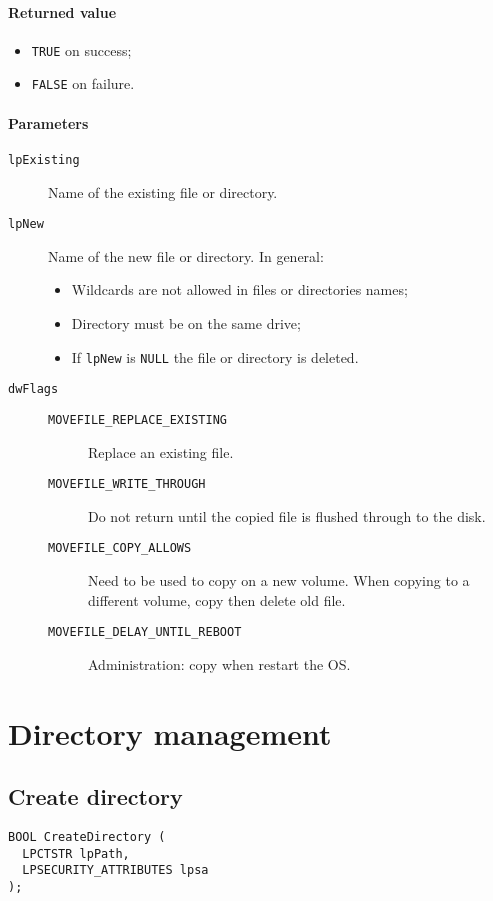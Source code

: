 \paragraph{Returned value}
\begin{itemize}
\item \texttt{TRUE} on success;
\item \texttt{FALSE} on failure.
\end{itemize}

\paragraph{Parameters}
\begin{description}
\item [\texttt{lpExisting}] Name of the existing file or directory.
\item [\texttt{lpNew}] Name of the new file or directory. In general:
\begin{itemize}
\item Wildcards are not allowed in files or directories names;
\item Directory must be on the same drive;
\item If \texttt{lpNew} is \texttt{NULL} the file or directory is deleted.
\end{itemize}
\item [\texttt{dwFlags}]
\begin{description}
\item [\texttt{MOVEFILE\_REPLACE\_EXISTING}] Replace an existing file.
\item [\texttt{MOVEFILE\_WRITE\_THROUGH}] Do not return until the copied file is flushed through to the disk.
\item [\texttt{MOVEFILE\_COPY\_ALLOWS}] Need to be used to copy on a new volume. When copying to a different volume, copy then delete old file.
\item [\texttt{MOVEFILE\_DELAY\_UNTIL\_REBOOT}] Administration: copy when restart the OS.
\end{description}
\end{description}

\section{Directory management}
\subsection{Create directory}
\begin{verbatim}
BOOL CreateDirectory (
  LPCTSTR lpPath,
  LPSECURITY_ATTRIBUTES lpsa
);
\end{verbatim}

